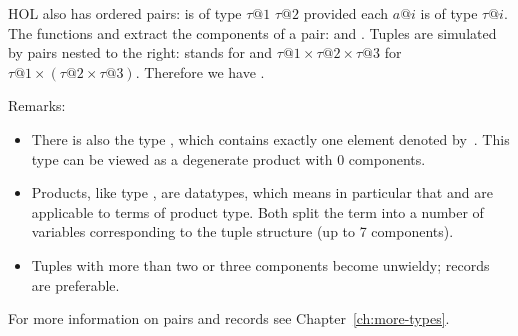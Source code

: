 %
\begin{isabellebody}%
\def\isabellecontext{pairs}%
%
\isadelimtheory
%
\endisadelimtheory
%
\isatagtheory
%
\endisatagtheory
{\isafoldtheory}%
%
\isadelimtheory
%
\endisadelimtheory
%
\begin{isamarkuptext}%
\label{sec:pairs}
HOL also has ordered pairs:  is of type $\tau@1$
 $\tau@2$ provided each $a@i$ is of type
$\tau@i$. The functions  and
 extract the components of a pair:
  and . Tuples
are simulated by pairs nested to the right:  stands
for  and $\tau@1 \times \tau@2 \times \tau@3$ for
$\tau@1 \times (\tau@2 \times \tau@3)$. Therefore we have
.

Remarks:
\begin{itemize}
\item
There is also the type , which contains exactly one
element denoted by~\cdx{()}.  This type can be viewed
as a degenerate product with 0 components.
\item
Products, like type , are datatypes, which means
in particular that  and  are applicable to
terms of product type.
Both split the term into a number of variables corresponding to the tuple structure
(up to 7 components).
\item
Tuples with more than two or three components become unwieldy;
records are preferable.
\end{itemize}
For more information on pairs and records see Chapter~\ref{ch:more-types}.%
\end{isamarkuptext}%
\isamarkuptrue%
%
\isadelimtheory
%
\endisadelimtheory
%
\isatagtheory
%
\endisatagtheory
{\isafoldtheory}%
%
\isadelimtheory
%
\endisadelimtheory
\end{isabellebody}%
